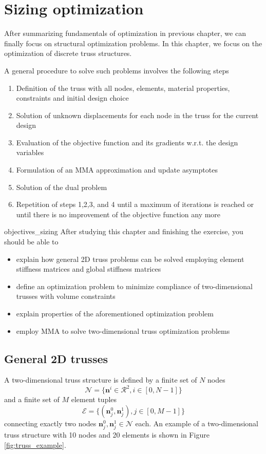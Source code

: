 \chapter{Sizing optimization}
After summarizing fundamentals of optimization in previous chapter, we can finally focus on structural optimization problems. In this chapter, we focus on the optimization of discrete truss structures. 

A general procedure to solve such problems involves the following steps \cite{Christensen2008}
\begin{enumerate}
    \item Definition of the truss with all nodes, elements, material properties, constraints and initial design choice
    \item Solution of unknown displacements for each node in the truss for the current design
    \item Evaluation of the objective function and its gradients w.r.t. the design variables
    \item Formulation of an MMA approximation and update asymptotes
    \item Solution of the dual problem 
    \item Repetition of steps 1,2,3, and 4 until a maximum of iterations is reached or until there is no improvement of the objective function any more
\end{enumerate}


\begin{objectives}{}{objectives_sizing}
After studying this chapter and finishing the exercise, you should be able to 
\begin{itemize}[label=$\dots$]
    \item explain how general 2D truss problems can be solved employing element stiffness matrices and global stiffness matrices
    \item define an optimization problem to minimize compliance of two-dimensional trusses with volume constraints
    \item explain properties of the aforementioned optimization problem
    \item employ MMA to solve two-dimensional truss optimization problems
\end{itemize}
\end{objectives}

\section{General 2D trusses}
A two-dimensional truss structure is defined by a finite set of $N$ nodes 
\begin{equation}
    \mathcal{N}=\{\mathbf{n}^i \in \mathcal{R}^2, i \in [0, N-1]\}
\end{equation} and a finite set of $M$ element tuples 
\begin{equation}
    \mathcal{E} = \{(\mathbf{n}^0_j, \mathbf{n}^1_j), j \in [0, M-1]\}
\end{equation} 
connecting exactly two nodes $\mathbf{n}^0_j,  \mathbf{n}^1_j \in \mathcal{N}$ each. An example of a two-dimensional truss structure with 10 nodes and 20 elements is shown in Figure \ref{fig:truss_example}.

